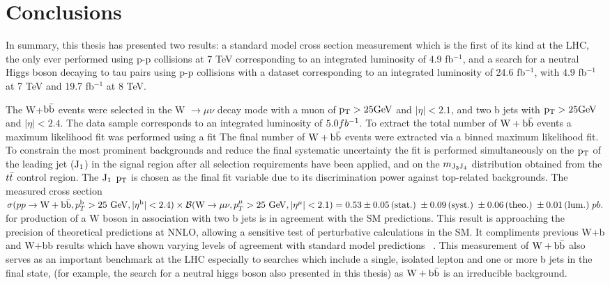 \chapter{Conclusions}
In summary, this thesis has presented two results:
a standard model cross section measurement 
which is the first of its kind at the LHC, the only 
ever performed using p-p collisions at 7 TeV corresponding to
an integrated luminosity of 4.9 fb$^{-1}$, and a search for 
a neutral Higgs boson decaying to tau pairs using p-p collisions
with a dataset corresponding to an integrated luminosity of 
24.6 fb$^{-1}$, with 4.9 fb$^{-1}$ at 7 TeV and 19.7 fb$^{-1}$ at 8 TeV. 

The W+$\mathrm{b\bar{b}}$ events were selected in the W $\to \mu\nu$ decay mode with a 
muon of $\mathrm{p_{T}}>25\mathrm{GeV}$ and $|\eta|<2.1$, and two b jets with $\mathrm{p_{T}}>25\mathrm{GeV}$ and $|\eta|<2.4$. 
The data sample corresponds to an integrated luminosity of $5.0fb^\mathrm{-1}$. 
To extract the total number of $\mathrm{W+\mathrm{b\bar{b}}}$ events a maximum likelihood fit
was performed using a fit 
The final number of $\mathrm{W+\mathrm{b\bar{b}}}$ events were extracted via a binned maximum likelihood fit.
To constrain the most prominent backgrounds and reduce the final
systematic uncertainty the fit is performed simultaneously on the $\mathrm{p_{T}}$ of the leading jet ($\rm{J_1}$) 
in the signal region after all selection requirements have been applied,
and on the $m_{\rm{J_3 J_4}}$ distribution obtained from the $t\bar{t}$ control region.
The  $\rm{J_1}$ $\mathrm{p_{T}}$  is chosen as the final fit variable due to its discrimination power against top-related backgrounds. The measured cross section 
$\sigma(pp\rightarrow \mathrm{W} + \mathrm{b\bar{b}}, p_T^{\mathrm{b}}>25~\mathrm{GeV}, |\eta^{\mathrm{b}}|<2.4)\times {\cal{B}}(\mathrm{W}\rightarrow \mu\nu, p_T^{\mu}>25~\mathrm{GeV}, |\eta^{\mu}|<2.1) =0.53\pm  0.05\,\mathrm{(stat.)\;} \pm 0.09 \,\mathrm{(syst.)\;} \pm 0.06 \,\mathrm{(theo.)}\; \pm 0.01\,\mathrm{(lum.)\;} pb.$
for production of a W boson in association with two b jets is in agreement with
the SM predictions.
This result is approaching the precision of theoretical predictions at NNLO, 
allowing a sensitive test of perturbative calculations
in the SM. It compliments previous W+b and W+bb results which
have shown varying levels of agreement 
with standard model predictions ~\cite{Aaltonen:2009qi,D0:2012qt,Aad:2011kp}. 
This measurement of $\mathrm{W+\mathrm{b\bar{b}}}$ also serves as an important
benchmark at the LHC especially to 
searches which include a single, isolated lepton and one or more b jets in the final state,
(for example, the search for a neutral higgs boson also presented in this thesis) 
as $\mathrm{W+\mathrm{b\bar{b}}}$ is an irreducible background. %

